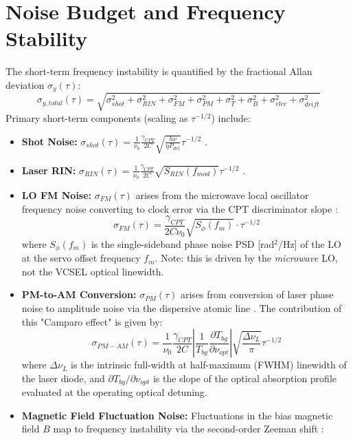 \documentclass[11pt,a4paper]{article}
\begin{document}
\section{Noise Budget and Frequency Stability}
The short-term frequency instability is quantified by the fractional Allan deviation $\sigma_y(\tau)$:
\begin{equation}
\sigma_{y,total}(\tau) = \sqrt{\sigma_{shot}^2 + \sigma_{RIN}^2 + \sigma_{FM}^2 + \sigma_{PM}^2 + \sigma_{T}^2 + \sigma_{B}^2 + \sigma_{elec}^2 + \sigma_{drift}^2}
\end{equation}
Primary short-term components (scaling as $\tau^{-1/2}$) include:
\begin{itemize}
    \item \textbf{Shot Noise:} $\sigma_{shot}(\tau) = \frac{1}{\nu_0} \frac{\gamma_{CPT}}{2 C} \sqrt{\frac{h\nu}{\eta P_{det}}} \tau^{-1/2}$ \cite{Wynands1999}.
    \item \textbf{Laser RIN:} $\sigma_{RIN}(\tau) = \frac{1}{\nu_0} \frac{\gamma_{CPT}}{2 C} \sqrt{S_{RIN}(f_{mod})} \tau^{-1/2}$ \cite{Vanier2005}.
    \item \textbf{LO FM Noise:} $\sigma_{FM}(\tau)$ arises from the microwave local oscillator frequency noise converting to clock error via the CPT discriminator slope \cite{Audoin1998}:
    \begin{equation}
    \sigma_{FM}(\tau) = \frac{\gamma_{CPT}}{2 C \nu_0} \sqrt{S_{\phi}(f_{m})} \cdot \tau^{-1/2}
    \end{equation}
    where $S_{\phi}(f_{m})$ is the single-sideband phase noise PSD [rad$^2$/Hz] of the LO at the servo offset frequency $f_m$. Note: this is driven by the \emph{microwave} LO, not the VCSEL optical linewidth.
    \item \textbf{PM-to-AM Conversion:} $\sigma_{PM}(\tau)$ arises from conversion of laser phase noise to amplitude noise via the dispersive atomic line \cite{Camparo1999}. The contribution of this "Camparo effect" is given by:
    \begin{equation}
    \sigma_{PM-AM}(\tau) = \frac{1}{\nu_0} \frac{\gamma_{CPT}}{2C} \left| \frac{1}{T_{bg}} \frac{\partial T_{bg}}{\partial \nu_{opt}} \right| \sqrt{ \frac{\Delta\nu_L}{\pi} } \tau^{-1/2}
    \end{equation}
    where $\Delta\nu_L$ is the intrinsic full-width at half-maximum (FWHM) linewidth of the laser diode, and $\partial T_{bg} / \partial \nu_{opt}$ is the slope of the optical absorption profile evaluated at the operating optical detuning.
    \item \textbf{Magnetic Field Fluctuation Noise:} Fluctuations in the bias magnetic field $B$ map to frequency instability via the second-order Zeeman shift \cite{Vanier1989}:

\end{itemize}
\end{document}
